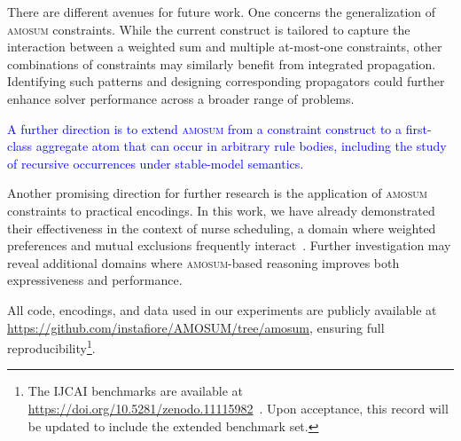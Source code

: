\documentclass[preprint,authoryear]{elsarticle}
\theoremstyle{definition}
\begin{document}
 There are different avenues for future work. 
One concerns the generalization of \textsc{amosum} constraints. While the current construct is tailored to capture the interaction between a weighted sum and multiple at-most-one constraints, other combinations of constraints may similarly benefit from integrated propagation.
Identifying such patterns and designing corresponding propagators could further enhance solver performance across a broader range of problems.

\textcolor{blue}{A further direction is to extend \textsc{amosum} from a constraint construct to a first-class aggregate atom that can occur in arbitrary rule bodies, including the study of recursive occurrences under stable-model semantics.}

Another promising direction for further research is the application of \textsc{amosum} constraints to practical encodings. 
In this work, we have already demonstrated their effectiveness in the context of nurse scheduling, a domain where weighted preferences and mutual exclusions frequently interact~\citep{DBLP:conf/lpnmr/DodaroM17}. 
Further investigation may reveal additional domains where \textsc{amosum}-based reasoning improves both expressiveness and performance.

All code, encodings, and data used in our experiments are publicly available at \url{https://github.com/instafiore/AMOSUM/tree/amosum}, ensuring full reproducibility\footnote{The IJCAI benchmarks are available at
\url{https://doi.org/10.5281/zenodo.11115982}~\citep{alviano_2024_11115982}. Upon acceptance, this record will be updated to include the extended benchmark set.}.





\end{document}
